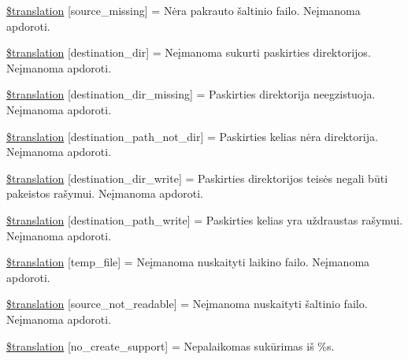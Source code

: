 \begin{DoxyCompactItemize}
\item 
\hyperlink{class_8upload_8lt___l_t_8php_aceaaf7355acaaf10f0ae60378d03c468}{\$translation} \mbox{[}\textquotesingle{}source\+\_\+missing\textquotesingle{}\mbox{]} = \textquotesingle{}Nėra pakrauto šaltinio failo. Neįmanoma apdoroti.\textquotesingle{}
\item 
\hyperlink{class_8upload_8lt___l_t_8php_aff2427c72a2598aefa6d58df1dd18b08}{\$translation} \mbox{[}\textquotesingle{}destination\+\_\+dir\textquotesingle{}\mbox{]} = \textquotesingle{}Neįmanoma sukurti paskirties direktorijos. Neįmanoma apdoroti.\textquotesingle{}
\item 
\hyperlink{class_8upload_8lt___l_t_8php_a9ef28d3cf09942c6c0a1e77fa09185e8}{\$translation} \mbox{[}\textquotesingle{}destination\+\_\+dir\+\_\+missing\textquotesingle{}\mbox{]} = \textquotesingle{}Paskirties direktorija neegzistuoja. Neįmanoma apdoroti.\textquotesingle{}
\item 
\hyperlink{class_8upload_8lt___l_t_8php_a5704a67137126e8c87b7a364175929d4}{\$translation} \mbox{[}\textquotesingle{}destination\+\_\+path\+\_\+not\+\_\+dir\textquotesingle{}\mbox{]} = \textquotesingle{}Paskirties kelias nėra direktorija. Neįmanoma apdoroti.\textquotesingle{}
\item 
\hyperlink{class_8upload_8lt___l_t_8php_a97608ea194a616db49141a0e6dee900c}{\$translation} \mbox{[}\textquotesingle{}destination\+\_\+dir\+\_\+write\textquotesingle{}\mbox{]} = \textquotesingle{}Paskirties direktorijos teisės negali būti pakeistos rašymui. Neįmanoma apdoroti.\textquotesingle{}
\item 
\hyperlink{class_8upload_8lt___l_t_8php_a40e4e1962226b89fd76da5819a9602b0}{\$translation} \mbox{[}\textquotesingle{}destination\+\_\+path\+\_\+write\textquotesingle{}\mbox{]} = \textquotesingle{}Paskirties kelias yra uždraustas rašymui. Neįmanoma apdoroti.\textquotesingle{}
\item 
\hyperlink{class_8upload_8lt___l_t_8php_a2baece8da11e20d45175db91851ec3e3}{\$translation} \mbox{[}\textquotesingle{}temp\+\_\+file\textquotesingle{}\mbox{]} = \textquotesingle{}Neįmanoma nuskaityti laikino failo. Neįmanoma apdoroti.\textquotesingle{}
\item 
\hyperlink{class_8upload_8lt___l_t_8php_a922967ca2df0efdd455261142d8e5715}{\$translation} \mbox{[}\textquotesingle{}source\+\_\+not\+\_\+readable\textquotesingle{}\mbox{]} = \textquotesingle{}Neįmanoma nuskaityti šaltinio failo. Neįmanoma apdoroti.\textquotesingle{}
\item 
\hyperlink{class_8upload_8lt___l_t_8php_a346dfd1ade29f583dd20d345c436859f}{\$translation} \mbox{[}\textquotesingle{}no\+\_\+create\+\_\+support\textquotesingle{}\mbox{]} = \textquotesingle{}Nepalaikomas sukūrimas iš \%s.\textquotesingle{}

\end{DoxyCompactItemize}
